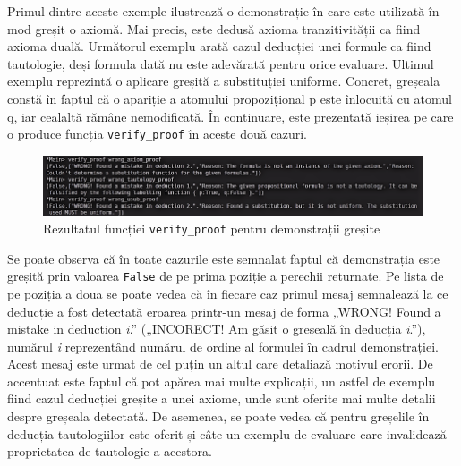 \documentclass[12pt, openany]{book}
\begin{document}
            \par{}
                Primul dintre aceste exemple ilustrează o demonstrație în care este utilizată în mod greșit o axiomă. 
                Mai precis, este dedusă axioma tranzitivității ca fiind axioma duală. Următorul exemplu arată cazul 
                deducției unei formule ca fiind tautologie, deși formula dată nu este adevărată pentru orice evaluare.
                Ultimul exemplu reprezintă o aplicare greșită a substituției uniforme. Concret, greșeala constă în
                faptul că o apariție a atomului propozițional p este înlocuită cu atomul q, iar cealaltă 
                rămâne nemodificată. În continuare, este prezentată ieșirea pe care o produce funcția 
                \texttt{verify\_proof} în aceste două cazuri. 
            
            \begin{figure}[h]
            \label{fig_wrong_proof}
                \includegraphics[width=\linewidth]{images/wrong_proof.png}
                \centering
                \caption{Rezultatul funcției \texttt{verify\_proof} pentru demonstrații greșite}
            \end{figure}

            \par{}
                Se poate observa că în toate cazurile este semnalat faptul că demonstrația este greșită prin valoarea 
                \texttt{False} de pe prima poziție a perechii returnate. Pe lista de pe poziția a doua se poate vedea că 
                în fiecare caz primul mesaj semnalează la ce deducție a fost detectată eroarea printr-un mesaj de forma 
                „WRONG! Found a mistake in deduction \textit{i}.” („INCORECT! Am găsit o greșeală în 
                deducția \textit{i}.”), numărul \textit{i} reprezentând numărul de ordine al formulei în cadrul demonstrației. 
                Acest mesaj este urmat de cel puțin un altul care detaliază motivul erorii. De accentuat este faptul 
                că pot apărea mai multe explicații, un astfel de exemplu fiind cazul deducției greșite a unei axiome, unde 
                sunt oferite mai multe detalii despre greșeala detectată. De asemenea, se poate vedea că pentru greșelile 
                în deducția tautologiilor este oferit și câte un exemplu de evaluare care invalidează proprietatea de 
                tautologie a acestora.
\end{document}
